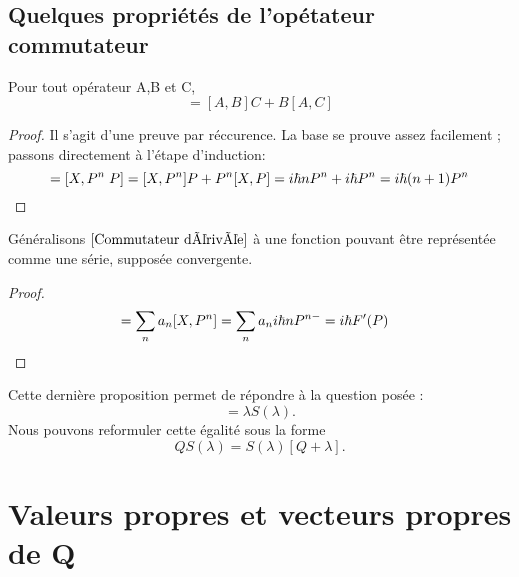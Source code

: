 \documentclass[../Notesdecours.tex]{subfiles}
\begin{document}
\subsection{Quelques propriétés de l'opétateur commutateur}
\begin{Property}
	Pour tout opérateur A,B et C,
	\begin{equation}
		[A,BC] = [A,B]C + B[A,C]
	\end{equation}
\end{Property}
\begin{proof}
	Il s'agit d'une preuve par réccurence. La base se prouve assez facilement ; passons directement à l'étape d'induction:
	\begin{equation*}
		[X,P^{n+1}] = [X,P^n \; P] = [X,P^n]P + P^n[X,P] = i\h nP^n + i\h P^n = i\h (n+1)P^n
	\end{equation*}
\end{proof}
Généralisons $\ref{Commutateur dérivée}$ à une fonction pouvant être représentée comme une série, supposée convergente.
\begin{proof}
	\begin{align*}
		[X,F(P)] &= \sum_n a_n [X,P^n] = \sum_n a_n i\h nP^{n-} = i\h F'(P)
	\end{align*}
\end{proof}

Cette dernière proposition permet de répondre à la question posée : 
\begin{equation}
	[X,S(\lambda)] = \lambda S(\lambda).	
\end{equation}
 Nous pouvons reformuler cette égalité sous la forme
\begin{equation}
	QS(\lambda) = S(\lambda)[Q+\lambda].
\end{equation}

\section{Valeurs propres et vecteurs propres de Q}
\end{document}
